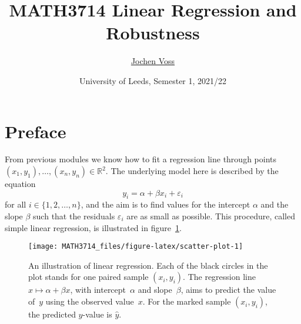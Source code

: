 \documentclass[
  a4paper,
]{article}
\title{MATH3714 Linear Regression and Robustness}
\author{\href{mailto:J.Voss@leeds.ac.uk}{Jochen Voss}}
\date{University of Leeds, Semester 1, 2021/22}
\theoremstyle{definition}
\theoremstyle{definition}
\theoremstyle{definition}
\theoremstyle{definition}
\theoremstyle{remark}
\begin{document}
\maketitle

{
\setcounter{tocdepth}{2}
\tableofcontents
}
\newcommand{\argmin}{\mathop{\mathrm{arg\,min}}\limits}
\newcommand{\bias}{\mathop{\mathrm{bias}}}
\newcommand{\cor}{\mathop{\mathrm{cor}}}
\newcommand{\Cov}{\mathop{\mathrm{Cov}}}
\newcommand{\CN}{\mathcal{N}}
\renewcommand{\d}{\partial}
\newcommand{\ds}{\displaystyle}
\newcommand{\E}{\mathbb{E}}
\newcommand{\eps}{\varepsilon}
\newcommand{\median}{\mathop{\mathrm{median}}}
\newcommand{\MSE}{\mathop{\mathrm{MSE}}\nolimits}
\renewcommand{\phi}{\varphi}
\newcommand{\R}{\mathbb{R}}
\newcommand{\rank}{\mathop{\mathrm{rank}}}
\newcommand{\se}{\mathop{\mathrm{se}}}
\newcommand{\sign}{\mathop{\mathrm{sign}}}
\newcommand{\stdev}{\mathop{\mathrm{stdev}}}
\newcommand{\tr}{\mathop{\mathrm{tr}}}
\newcommand{\Var}{\mathop{\mathrm{Var}}}
\newcommand{\xfrac}[2]{\frac{\,#1\,}{\,#2\,}}

\hypertarget{home}{%
\section*{Preface}\label{home}}

From previous modules we know how to fit a regression line through
points \((x_1, y_1), \ldots, (x_n, y_n) \in\mathbb{R}^2\). The underlying model
here is described by the equation
\begin{equation*}
  y_i
  = \alpha + \beta x_i + \varepsilon_i
\end{equation*}
for all \(i \in \{1, 2, \ldots, n\}\), and the aim is to find values for
the intercept \(\alpha\) and the slope \(\beta\) such that the residuals
\(\varepsilon_i\) are as small as possible. This procedure, called simple
linear regression, is illustrated in figure~\ref{fig:scatter-plot}.



\begin{figure}

{\centering \texttt{[image: MATH3714\_files/figure-latex/scatter-plot-1]} 

}

\caption{An illustration of linear regression. Each of the black circles in the plot stands for one paired sample \((x_i, y_i)\). The regression line \(x \mapsto \alpha + \beta x\), with intercept~\(\alpha\) and slope~\(\beta\), aims to predict the value of~\(y\) using the observed value~\(x\). For the marked sample \((x_i, y_i)\), the predicted \(y\)-value is \(\hat y\).}\label{fig:scatter-plot}
\end{figure}
\end{document}
